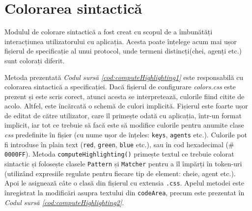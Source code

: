\section{Colorarea sintactică}
Modulul de colorare sintactică a fost creat cu scopul de a îmbunătăți interacțiunea utilizatorului cu aplicația. Acesta poate înțelege acum mai ușor fișierul de specificație al unui protocol, unde termeni distincți(chei, agenți etc.) sunt colorați diferit.
\par
Metoda prezentată \textit{Codul sursă \ref{cod:computeHighlighting1}} este responsabilă cu colorarea sintactică a specificației. Dacă fișierul de configurare \textit{colors.css} este prezent și este scris corect, atunci acesta se interpretează, culorile fiind citite de acolo. Altfel, este încărcată o schemă de culori implicită. Fișierul este foarte ușor de editat de către utilizator, care îl primește odată cu aplicația, într-un format implicit, iar tot ce trebuie să facă este să modifice culorile pentru anumite clase \textit{css} predefinite în fișier (cu nume ușor de înțeles: \texttt{keys}, \texttt{agents} etc.). Culorile pot fi introduse în plain text (\texttt{red}, \texttt{green}, \texttt{blue} etc.), sau în cod hexadecimal (\texttt{$\#$0000FF}). Metoda \texttt{computeHighlighting()} primește textul ce trebuie colorat sintactic și folosește clasele \texttt{Pattern} și \texttt{Matcher} pentru a îl împărți în token-uri (utilizând expresiile regulate pentru fiecare tip de element: cheie, agent etc.). Apoi le asignează câte o clasă din fișierul cu extensia \texttt{.css}. Apelul metodei este înregistrat la modificări asupra textului din \texttt{codeArea}, precum este prezentat în \textit{Codul sursă \ref{cod:computeHighlighting2}}.
\\
